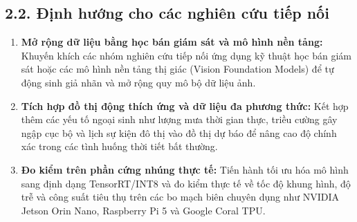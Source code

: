 \subsection*{2.2. Định hướng cho các nghiên cứu tiếp nối}
\begin{enumerate}
    \item \textbf{Mở rộng dữ liệu bằng học bán giám sát và mô hình nền tảng:} 
    Khuyến khích các nhóm nghiên cứu tiếp nối ứng dụng kỹ thuật học bán giám sát hoặc các mô hình nền tảng thị giác (Vision Foundation Models) để tự động sinh giả nhãn và mở rộng quy mô bộ dữ liệu ảnh.
    \item \textbf{Tích hợp đồ thị động thích ứng và dữ liệu đa phương thức:} 
    Kết hợp thêm các yếu tố ngoại sinh như lượng mưa thời gian thực, triều cường gây ngập cục bộ và lịch sự kiện đô thị vào đồ thị dự báo để nâng cao độ chính xác trong các tình huống thời tiết bất thường.
    \item \textbf{Đo kiểm trên phần cứng nhúng thực tế:} 
    Tiến hành tối ưu hóa mô hình sang định dạng TensorRT/INT8 và đo kiểm thực tế về tốc độ khung hình, độ trễ và công suất tiêu thụ trên các bo mạch biên chuyên dụng như NVIDIA Jetson Orin Nano, Raspberry Pi 5 và Google Coral TPU.
\end{enumerate}
